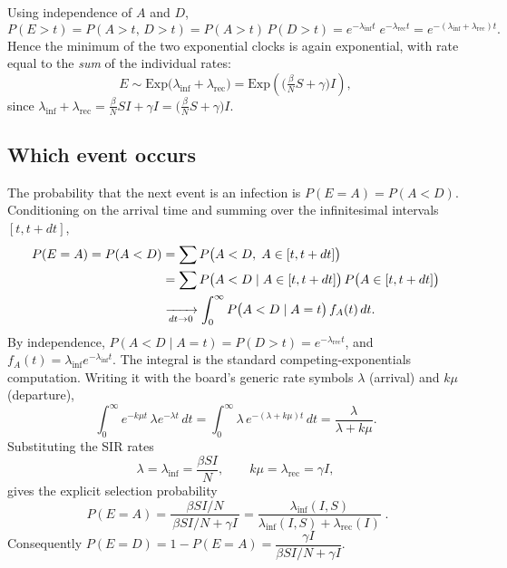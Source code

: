 Using independence of $A$ and $D$,
\begin{equation}
  P(E>t) = P(A>t,\,D>t) = P(A>t)\,P(D>t)
         = e^{-\lambda_{\mathrm{inf}}t}\;e^{-\lambda_{\mathrm{rec}}t}
         = e^{-(\lambda_{\mathrm{inf}}+\lambda_{\mathrm{rec}})t}.
\end{equation}
Hence the minimum of the two exponential clocks is again exponential, with rate
equal to the \emph{sum} of the individual rates:
\begin{equation}
  E \sim \mathrm{Exp}\!\big(\lambda_{\mathrm{inf}}+\lambda_{\mathrm{rec}}\big)
    = \mathrm{Exp}\!\left(\Big(\tfrac{\beta}{N}S+\gamma\Big)I\right),
  \label{eq:holding}
\end{equation}
since
$\lambda_{\mathrm{inf}}+\lambda_{\mathrm{rec}}
 = \tfrac{\beta}{N}SI+\gamma I = \big(\tfrac{\beta}{N}S+\gamma\big)I$.

\subsection{Which event occurs}

The probability that the next event is an infection is $P(E=A)=P(A<D)$.
Conditioning on the arrival time and summing over the infinitesimal intervals
$[t,t+dt]$,
\begin{align}
  P(E=A) = P(A<D)
  &= \sum P\big(A<D,\; A\in[t,t+dt]\big) \notag\\
  &= \sum P\big(A<D \mid A\in[t,t+dt]\big)\,P\big(A\in[t,t+dt]\big) \notag\\
  &\xrightarrow[dt\to 0]{}
     \int_{0}^{\infty} P\big(A<D \mid A=t\big)\,f_A(t)\,dt .
  \label{eq:PEA_int}
\end{align}
By independence, $P(A<D\mid A=t)=P(D>t)=e^{-\lambda_{\mathrm{rec}}t}$, and
$f_A(t)=\lambda_{\mathrm{inf}}e^{-\lambda_{\mathrm{inf}}t}$. The integral is the
standard competing-exponentials computation. Writing it with the board's
generic rate symbols $\lambda$ (arrival) and $k\mu$ (departure),
\begin{equation}
  \int_{0}^{\infty} e^{-k\mu t}\,\lambda e^{-\lambda t}\,dt
  = \int_{0}^{\infty} \lambda\, e^{-(\lambda+k\mu)t}\,dt
  = \frac{\lambda}{\lambda + k\mu}.
  \label{eq:PEA_generic}
\end{equation}
Substituting the SIR rates
\begin{equation}
  \lambda = \lambda_{\mathrm{inf}} = \frac{\beta SI}{N},
  \qquad
  k\mu = \lambda_{\mathrm{rec}} = \gamma I,
\end{equation}
gives the explicit selection probability
\begin{equation}
  \boxed{\;
  P(E=A)
  = \frac{\beta SI/N}{\,\beta SI/N + \gamma I\,}
  = \frac{\lambda_{\mathrm{inf}}(I,S)}
         {\lambda_{\mathrm{inf}}(I,S)+\lambda_{\mathrm{rec}}(I)} \; }.
  \label{eq:PEA}
\end{equation}
Consequently $P(E=D)=1-P(E=A)=\dfrac{\gamma I}{\beta SI/N+\gamma I}$.

